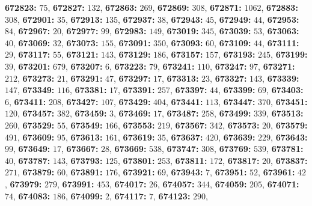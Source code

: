 \textsf{\bfseries 672823:} $75$, \textsf{\bfseries 672827:} $132$, \textsf{\bfseries 672863:} $269$, \textsf{\bfseries 672869:} $308$, \textsf{\bfseries 672871:} $1062$, \textsf{\bfseries 672883:} $308$, \textsf{\bfseries 672901:} $35$, \textsf{\bfseries 672913:} $135$, \textsf{\bfseries 672937:} $38$, \textsf{\bfseries 672943:} $45$, \textsf{\bfseries 672949:} $44$, \textsf{\bfseries 672953:} $84$, \textsf{\bfseries 672967:} $20$, \textsf{\bfseries 672977:} $99$, \textsf{\bfseries 672983:} $149$, \textsf{\bfseries 673019:} $345$, \textsf{\bfseries 673039:} $53$, \textsf{\bfseries 673063:} $40$, \textsf{\bfseries 673069:} $32$, \textsf{\bfseries 673073:} $155$, \textsf{\bfseries 673091:} $350$, \textsf{\bfseries 673093:} $60$, \textsf{\bfseries 673109:} $44$, \textsf{\bfseries 673111:} $29$, \textsf{\bfseries 673117:} $55$, \textsf{\bfseries 673121:} $143$, \textsf{\bfseries 673129:} $186$, \textsf{\bfseries 673157:} $157$, \textsf{\bfseries 673193:} $245$, \textsf{\bfseries 673199:} $39$, \textsf{\bfseries 673201:} $679$, \textsf{\bfseries 673207:} $6$, \textsf{\bfseries 673223:} $79$, \textsf{\bfseries 673241:} $110$, \textsf{\bfseries 673247:} $97$, \textsf{\bfseries 673271:} $212$, \textsf{\bfseries 673273:} $21$, \textsf{\bfseries 673291:} $47$, \textsf{\bfseries 673297:} $17$, \textsf{\bfseries 673313:} $23$, \textsf{\bfseries 673327:} $143$, \textsf{\bfseries 673339:} $147$, \textsf{\bfseries 673349:} $116$, \textsf{\bfseries 673381:} $17$, \textsf{\bfseries 673391:} $257$, \textsf{\bfseries 673397:} $44$, \textsf{\bfseries 673399:} $69$, \textsf{\bfseries 673403:} $6$, \textsf{\bfseries 673411:} $208$, \textsf{\bfseries 673427:} $107$, \textsf{\bfseries 673429:} $404$, \textsf{\bfseries 673441:} $113$, \textsf{\bfseries 673447:} $370$, \textsf{\bfseries 673451:} $120$, \textsf{\bfseries 673457:} $382$, \textsf{\bfseries 673459:} $3$, \textsf{\bfseries 673469:} $17$, \textsf{\bfseries 673487:} $258$, \textsf{\bfseries 673499:} $339$, \textsf{\bfseries 673513:} $260$, \textsf{\bfseries 673529:} $55$, \textsf{\bfseries 673549:} $166$, \textsf{\bfseries 673553:} $219$, \textsf{\bfseries 673567:} $342$, \textsf{\bfseries 673573:} $20$, \textsf{\bfseries 673579:} $491$, \textsf{\bfseries 673609:} $95$, \textsf{\bfseries 673613:} $161$, \textsf{\bfseries 673619:} $35$, \textsf{\bfseries 673637:} $420$, \textsf{\bfseries 673639:} $229$, \textsf{\bfseries 673643:} $99$, \textsf{\bfseries 673649:} $17$, \textsf{\bfseries 673667:} $28$, \textsf{\bfseries 673669:} $538$, \textsf{\bfseries 673747:} $308$, \textsf{\bfseries 673769:} $539$, \textsf{\bfseries 673781:} $40$, \textsf{\bfseries 673787:} $143$, \textsf{\bfseries 673793:} $125$, \textsf{\bfseries 673801:} $253$, \textsf{\bfseries 673811:} $172$, \textsf{\bfseries 673817:} $20$, \textsf{\bfseries 673837:} $271$, \textsf{\bfseries 673879:} $60$, \textsf{\bfseries 673891:} $176$, \textsf{\bfseries 673921:} $69$, \textsf{\bfseries 673943:} $7$, \textsf{\bfseries 673951:} $52$, \textsf{\bfseries 673961:} $42$, \textsf{\bfseries 673979:} $279$, \textsf{\bfseries 673991:} $453$, \textsf{\bfseries 674017:} $26$, \textsf{\bfseries 674057:} $344$, \textsf{\bfseries 674059:} $205$, \textsf{\bfseries 674071:} $74$, \textsf{\bfseries 674083:} $186$, \textsf{\bfseries 674099:} $2$, \textsf{\bfseries 674117:} $7$, \textsf{\bfseries 674123:} $290$, 
